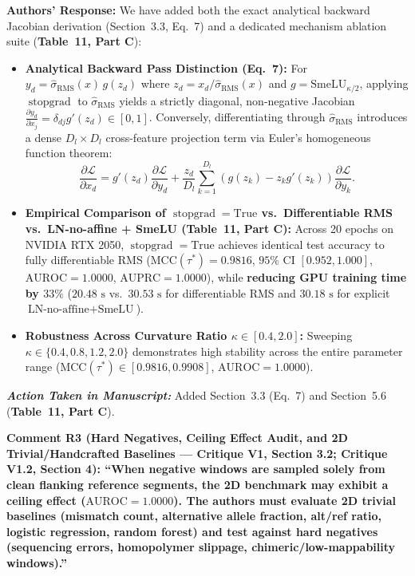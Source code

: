 \documentclass[11pt,a4paper]{article}
\newcommand{\revcomment}[1]{\vspace{0.8em}\noindent\textbf{\textcolor{blue!75!black}{#1}}\par\vspace{0.3em}}
\newcommand{\authorsresponse}{\noindent\textbf{Authors' Response: }}
\newcommand{\manuscriptchange}{\vspace{0.3em}\noindent\textit{\textbf{Action Taken in Manuscript: }}}
\begin{document}
\authorsresponse We have added both the exact analytical backward Jacobian derivation (Section~3.3, Eq.~7) and a dedicated mechanism ablation suite (\textbf{Table~11, Part C}):
\begin{itemize}
    \item \textbf{Analytical Backward Pass Distinction (Eq.~7):} For $y_d = \hat{\sigma}_{\text{RMS}}(x)\,g(z_d)$ where $z_d = x_d/\hat{\sigma}_{\text{RMS}}(x)$ and $g = \text{SmeLU}_{\kappa/2}$, applying $\operatorname{stopgrad}$ to $\hat{\sigma}_{\text{RMS}}$ yields a strictly diagonal, non-negative Jacobian $\frac{\partial y_d}{\partial x_j} = \delta_{dj} g'(z_d) \in [0, 1]$. Conversely, differentiating through $\hat{\sigma}_{\text{RMS}}$ introduces a dense $D_l \times D_l$ cross-feature projection term via Euler's homogeneous function theorem:
    \[
        \frac{\partial \mathcal{L}}{\partial x_d} = g'(z_d)\frac{\partial \mathcal{L}}{\partial y_d} + \frac{z_d}{D_l}\sum_{k=1}^{D_l}\!\left(g(z_k) - z_k g'(z_k)\right)\frac{\partial \mathcal{L}}{\partial y_k}.
    \]
    \item \textbf{Empirical Comparison of $\operatorname{stopgrad}=\text{True}$ vs.\ Differentiable RMS vs.\ LN-no-affine + SmeLU (Table~11, Part C):} Across 20 epochs on NVIDIA RTX 2050, $\operatorname{stopgrad}=\text{True}$ achieves identical test accuracy to fully differentiable RMS ($\text{MCC}(\tau^*) = 0.9816$, $95\%\text{ CI } [0.952, 1.000]$, $\text{AUROC} = 1.0000$, $\text{AUPRC} = 1.0000$), while \textbf{reducing GPU training time by $33\%$} ($20.48\text{ s}$ vs.\ $30.53\text{ s}$ for differentiable RMS and $30.18\text{ s}$ for explicit $\text{LN-no-affine} + \text{SmeLU}$).
    \item \textbf{Robustness Across Curvature Ratio $\kappa \in [0.4, 2.0]$:} Sweeping $\kappa \in \{0.4, 0.8, 1.2, 2.0\}$ demonstrates high stability across the entire parameter range ($\text{MCC}(\tau^*) \in [0.9816, 0.9908]$, $\text{AUROC} = 1.0000$).
\end{itemize}

\manuscriptchange Added Section~3.3 (Eq.~7) and Section~5.6 (\textbf{Table~11, Part C}).

\revcomment{Comment R3 (Hard Negatives, Ceiling Effect Audit, and 2D Trivial/Handcrafted Baselines --- Critique V1, Section 3.2; Critique V1.2, Section 4):
``When negative windows are sampled solely from clean flanking reference segments, the 2D benchmark may exhibit a ceiling effect ($\text{AUROC} = 1.0000$). The authors must evaluate 2D trivial baselines (mismatch count, alternative allele fraction, alt/ref ratio, logistic regression, random forest) and test against hard negatives (sequencing errors, homopolymer slippage, chimeric/low-mappability windows).''}
\end{document}
